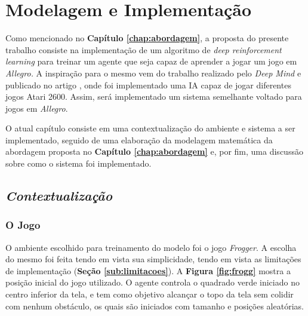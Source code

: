 \chapter{Modelagem e Implementação}
\label{chap:model}

Como mencionado no \textbf{Capítulo \ref{chap:abordagem}}, a proposta do presente trabalho consiste na implementação de um algoritmo de \textit{deep reinforcement learning} para treinar um agente que seja capaz de aprender a jogar um jogo em \textit{Allegro.} A inspiração para o mesmo vem do trabalho realizado pelo \textit{Deep Mind} e publicado no artigo \cite{play-atari-drl-deepmind}, onde foi implementado uma IA capaz de jogar diferentes jogos Atari 2600. Assim, será implementado um sistema semelhante voltado para jogos em \textit{Allegro}.

O atual capítulo consiste em uma contextualização do ambiente e sistema a ser implementado, seguido de uma elaboração da modelagem matemática da abordagem proposta no \textbf{Capítulo \ref{chap:abordagem}} e, por fim, uma discussão sobre como o sistema foi implementado.

\section{\textit{Contextualização}} %
\label{sec:contextualizacao}


\subsection{O Jogo} %
\label{sub:o_jogo}

O ambiente escolhido para treinamento do modelo foi o jogo \textit{Frogger}. A escolha do mesmo foi feita tendo em vista sua simplicidade, tendo em vista as limitações de implementação (\textbf{Seção \ref{sub:limitacoes}}). A \textbf{Figura \ref{fig:frogg}} mostra a posição inicial do jogo utilizado. O agente controla o quadrado verde iniciado no centro inferior da tela, e tem como objetivo alcançar o topo da tela sem colidir com nenhum obstáculo, os quais são iniciados com tamanho e posições aleatórias.

